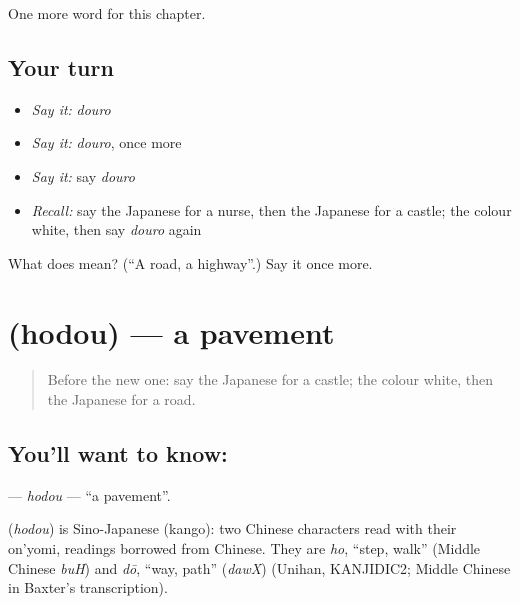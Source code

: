 \begin{grammarlens}[title={What you've built}]
One more word for this chapter.
\end{grammarlens}

\subsection*{Your turn}
\begin{itemize}
\raggedright
  \item \emph{Say it:} \emph{douro}
  \item \emph{Say it:} \emph{douro}, once more
  \item \emph{Say it:} say \emph{douro}
  \item \emph{Recall:} say the Japanese for a nurse, then the Japanese for a castle; the colour white, then say \emph{douro} again
\end{itemize}

\begin{tcolorbox}[breakable,colback=teal!4,colframe=teal!35!black,title={Before you move on}]
What does  mean? (\textquotedblleft{}A road, a highway\textquotedblright{}.) Say it once more.
\end{tcolorbox}
\section[\texorpdfstring{\ja{ほどう} (hodou)}{ほどう (hodou)}]{ (hodou) — a pavement}

\label{lesson:JA-C111-hodou}



\begin{quote}
Before the new one: say the Japanese for a castle; the colour white, then the Japanese for a road.
\end{quote}

\subsection*{You'll want to know: }
\textbf{} — \emph{hodou} — \textquotedblleft{}a pavement\textquotedblright{}.

\begin{cousinweb}
\textbf{} (\emph{hodou}) is Sino-Japanese (kango): two Chinese characters read with their on'yomi, readings borrowed from Chinese. They are \emph{ho}, \textquotedblleft{}step, walk\textquotedblright{} (Middle Chinese \emph{buH}) and \emph{dō}, \textquotedblleft{}way, path\textquotedblright{} (\emph{dawX}) (Unihan, KANJIDIC2; Middle Chinese in Baxter's transcription).
\end{cousinweb}

